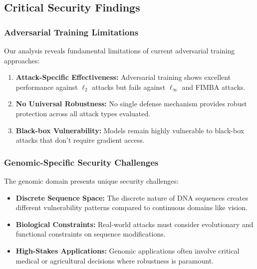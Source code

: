 \documentclass{article} %
\begin{document}
\subsection{Critical Security Findings}

\subsubsection{Adversarial Training Limitations}

Our analysis reveals fundamental limitations of current adversarial training approaches:

\begin{enumerate}
    \item \textbf{Attack-Specific Effectiveness:} Adversarial training shows excellent performance against $\ell_2$ attacks but fails against $\ell_\infty$ and FIMBA attacks.
    
    \item \textbf{No Universal Robustness:} No single defense mechanism provides robust protection across all attack types evaluated.
    
    \item \textbf{Black-box Vulnerability:} Models remain highly vulnerable to black-box attacks that don't require gradient access.
\end{enumerate}

\subsubsection{Genomic-Specific Security Challenges}

The genomic domain presents unique security challenges:

\begin{itemize}
    \item \textbf{Discrete Sequence Space:} The discrete nature of DNA sequences creates different vulnerability patterns compared to continuous domains like vision.
    
    \item \textbf{Biological Constraints:} Real-world attacks must consider evolutionary and functional constraints on sequence modifications.
    
    \item \textbf{High-Stakes Applications:} Genomic applications often involve critical medical or agricultural decisions where robustness is paramount.
\end{itemize}
\end{document}
